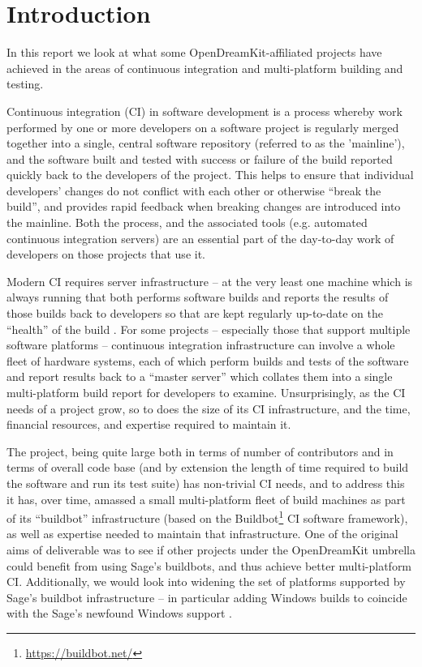 \documentclass{deliverablereport}
\author{Erik Bray, et. al.}
\begin{document}
\maketitle

\hypertarget{introduction}{%
\section{Introduction}\label{introduction}}

In this report we look at what some OpenDreamKit-affiliated projects have
achieved in the areas of continuous integration and multi-platform building and
testing.

Continuous integration (CI) in software development is a process whereby work
performed by one or more developers on a software project is regularly merged
together into a single, central software repository (referred to as the
'mainline'), and the software built and tested with success or failure of the
build reported quickly back to the developers of the project.  This helps to
ensure that individual developers' changes do not conflict with each other or
otherwise ``break the build'', and provides rapid feedback when breaking changes
are introduced into the mainline.  Both the process, and the associated tools
(e.g. automated continuous integration servers) are an essential part of the
day-to-day work of developers on those projects that use it.

Modern CI requires server infrastructure -- at the very least one machine which
is always running that both performs software builds and reports the results of
those builds back to developers so that are kept regularly up-to-date on the
``health'' of the build .
For some projects --  especially those that support multiple software platforms
-- continuous integration infrastructure can involve a whole fleet of hardware
systems, each of which perform builds and tests of the software and report
results back to a ``master server'' which collates them into a single
multi-platform build report for developers to examine.  Unsurprisingly, as the
CI needs of a project grow, so to does the size of its CI infrastructure, and
the time, financial resources, and expertise required to maintain it.

The \Sage project, being quite large both in terms of number of contributors
and in terms of overall code base (and by extension the length of time required
to build the software and run its test suite) has non-trivial CI needs, and to
address this it has, over time, amassed a small multi-platform fleet of build
machines as part of its ``buildbot'' infrastructure (based on the
Buildbot\footnote{\url{https://buildbot.net/}} CI software framework), as well
as expertise needed to maintain that infrastructure.  One of the original aims
of deliverable was to see if other projects under the OpenDreamKit umbrella
could benefit from using Sage's buildbots, and thus achieve better
multi-platform CI.  Additionally, we would look into widening the set of
platforms supported by Sage's buildbot infrastructure -- in particular adding
Windows builds to coincide with the Sage's newfound Windows support
.
\end{document}
